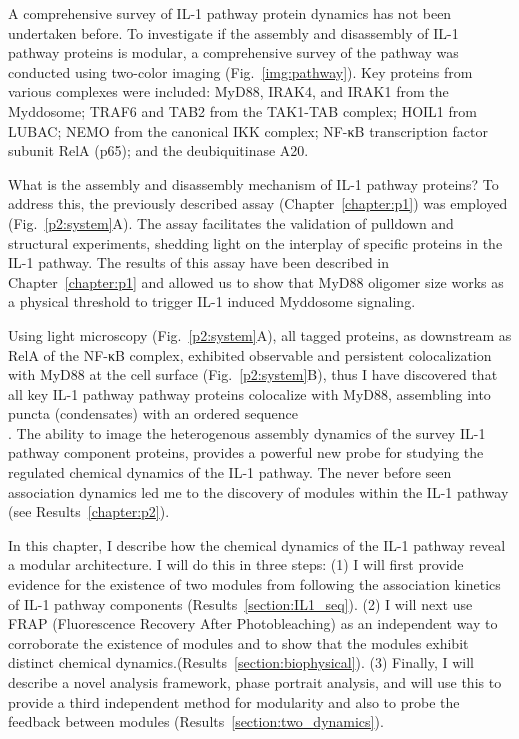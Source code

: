 A comprehensive survey of IL-1 pathway protein dynamics has not been undertaken before. To investigate if the assembly and disassembly of IL-1 pathway proteins is modular, a comprehensive survey of the pathway was conducted using two-color imaging (Fig.~\ref{img:pathway}). Key proteins from various complexes were included: MyD88, IRAK4, and IRAK1 from the Myddosome; TRAF6 and TAB2 from the TAK1-TAB complex; HOIL1 from LUBAC; NEMO from the canonical IKK complex; NF-κB transcription factor subunit RelA (p65); and the deubiquitinase A20.

What is the assembly and disassembly mechanism of IL-1 pathway proteins? To address this, the previously described assay (Chapter~\ref{chapter:p1}) was employed (Fig.~\ref{p2:system}A). The assay facilitates the validation of pulldown and structural experiments, shedding light on the interplay of specific proteins in the IL-1 pathway. The results of this assay have been described in Chapter~\ref{chapter:p1} and allowed us to show that MyD88 oligomer size works as a physical threshold to trigger IL-1 induced Myddosome signaling.

Using light microscopy (Fig.~\ref{p2:system}A), all tagged proteins, as downstream as RelA of the NF-κB complex, exhibited observable and persistent colocalization with MyD88 at the cell surface (Fig.~\ref{p2:system}B), thus I have discovered that all key IL-1 pathway pathway proteins colocalize with MyD88, assembling into puncta (condensates) with an ordered sequence \autocite{Lin_2010}\autocite{Ye_2002}\autocite{Kelsall_2019}\autocite{Tarantino_2014}\\\autocite{Jäättelä_1996}\autocite{Sizemore_1999}\autocite{Takaesu_2000}\autocite{Cohen_2020}. The ability to image the heterogenous assembly dynamics of the survey IL-1 pathway component proteins, provides a powerful new probe for studying the regulated chemical dynamics of the IL-1 pathway. The never before seen association dynamics led me to the discovery of modules within the IL-1 pathway (see Results~\ref{chapter:p2}).

In this chapter, I describe how the chemical dynamics of the IL-1 pathway reveal a modular architecture. I will do this in three steps: (1) I will first provide evidence for the existence of two modules from following the association kinetics of IL-1 pathway components (Results~\ref{section:IL1_seq}). (2) I will next use FRAP (Fluorescence Recovery After Photobleaching) as an independent way to corroborate the existence of modules and to show that the modules exhibit distinct chemical dynamics.(Results~\ref{section:biophysical}). (3) Finally, I will describe a novel analysis framework, phase portrait analysis, and will use this to provide a third independent method for modularity and also to probe the feedback between modules (Results~\ref{section:two_dynamics}).


